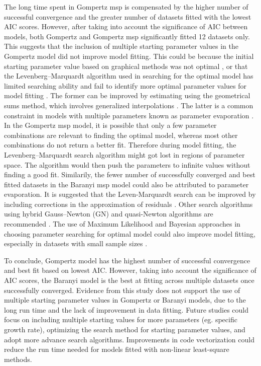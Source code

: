 \documentclass[11pt]{article}
\begin{document}
The long time spent in Gompertz msp is compensated by the higher number of successful convergence and the greater number of datasets fitted with the lowest AIC scores. However, after taking into account the significance of AIC between models, both Gompertz and Gompertz msp significantly fitted 12 datasets only. This suggests that the inclusion of multiple starting parameter values in the Gompertz model did not improve model fitting. This could be because the initial starting parameter value based on graphical methods was not optimal \cite{holmstrom_review_2002}, or that the Levenberg–Marquardt algorithm used in searching for the optimal model has limited searching ability and fail to identify more optimal parameter values for model fitting \cite{transtrum_improvements_2012}. The former can be improved by estimating using the geometrical sums method, which involves generalized interpolations \cite{holmstrom_review_2002}. The latter is a common constraint in models with multiple parameters known as parameter evaporation \cite{transtrum_why_2010}. In the Gompertz msp model, it is possible that only a few parameter combinations are relevant to finding the optimal model, whereas most other combinations do not return a better fit. Therefore during model fitting, the Levenberg–Marquardt search algorithm might got lost in regions of parameter space. The algorithm would then push the parameters to infinite values without finding a good fit. Similarily, the fewer number of successfully converged and best fitted datasets in the Baranyi msp model could also be attributed to parameter evaporation. It is suggested that the Leven-Marquardt search can be improved by including corrections in the approximation of residuals \cite{transtrum_improvements_2012}. Other search algorithms using hybrid Gauss–Newton (GN) and quasi-Newton algorithms are recommended \cite{holmstrom_review_2002}. The use of Maximum Likelihood and Bayesian approaches in choosing parameter searching for optimal model could also improve model fitting, especially in datasets with small sample sizes \cite{zondervan-zwijnenburg_pushing_2018}. 
\vspace{\baselineskip}

To conclude, Gompertz model has the highest number of successful convergence and best fit based on lowest AIC. However, taking into account the significance of AIC scores, the Baranyi model is the best at fitting across multiple datasets once successfully converged. Evidence from this study does not support the use of multiple starting parameter values in Gompertz or Baranyi models, due to the long run time and the lack of improvement in data fitting. Future studies could focus on including multiple starting values for more parameters (eg. specific growth rate), optimizing the search method for starting parameter values, and adopt more advance search algorithms. Improvements in code vectorization could reduce the run time needed for models fitted with non-linear least-square methods. 
\vspace{\baselineskip}








\printbibliography
\end{document}
